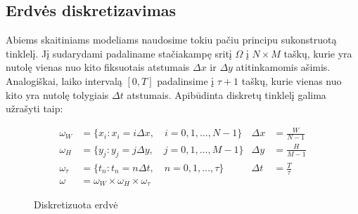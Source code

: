 \subsection{Erdvės diskretizavimas}

Abiems skaitiniams modeliams naudosime tokiu pačiu principu sukonstruotą tinklelį. Jį sudarydami padaliname stačiakampę sritį $\Omega$ į $N\times M$ taškų, kurie yra nutolę vienas nuo kito fiksuotais atstumais $\Delta x$ ir $\Delta y$ atitinkamomis ašimis. Analogiškai, laiko intervalą $[0, T]$ padalinsime į $\tau + 1$ taškų, kurie vienas nuo kito yra nutolę tolygiais $\Delta t$ atstumais. Apibūdinta diskretų tinklelį galima užrašyti taip:

\begin{align}
    \omega_W&=\{ x_i : x_i = i\Delta x, \quad i=0, 1, \dots, N - 1 \} & \Delta x&=\frac{W}{N-1} \label{meshx}\\
    \omega_H&=\{ y_j : y_j = j\Delta y, \quad j=0, 1, \dots, M - 1 \} & \Delta y&=\frac{H}{M-1} \label{meshy}\\
    \omega_\tau&=\{ t_n : t_n = n\Delta t,\quad n=0, 1, \dots, \tau\} & \Delta t&=\frac{T}{\tau} \label{mesht}\\
	\omega&=\omega_W\times\omega_H\times\omega_\tau \label{mesh}
\end{align}

\begin{figure}[!h]
\centering
{}
\caption{ Diskretizuota erdvė }
\end{figure}

\newpage